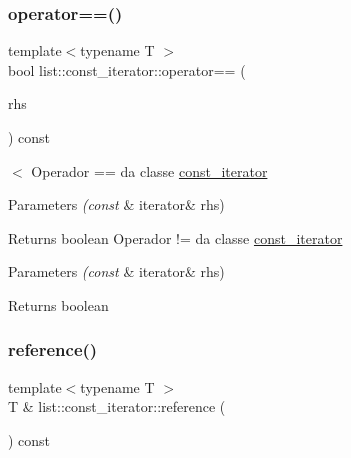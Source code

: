 \subsubsection{\texorpdfstring{operator==()}{operator==()}}
{\footnotesize\ttfamily template$<$typename T $>$ \\
bool list\+::const\+\_\+iterator\+::operator== (\begin{DoxyParamCaption}\item[{const \mbox{\hyperlink{classsc_1_1list_1_1const__iterator}{const\+\_\+iterator}} \&}]{rhs }\end{DoxyParamCaption}) const}

$<$ Operador == da classe \mbox{\hyperlink{classsc_1_1list_1_1const__iterator}{const\+\_\+iterator}} 
\begin{DoxyParams}{Parameters}
{\em (const} & iterator\& rhs) \\
\hline
\end{DoxyParams}
\begin{DoxyReturn}{Returns}
boolean  Operador != da classe \mbox{\hyperlink{classsc_1_1list_1_1const__iterator}{const\+\_\+iterator}} 
\end{DoxyReturn}

\begin{DoxyParams}{Parameters}
{\em (const} & iterator\& rhs) \\
\hline
\end{DoxyParams}
\begin{DoxyReturn}{Returns}
boolean 
\end{DoxyReturn}
\mbox{\label{classsc_1_1list_1_1const__iterator_acc55cfde0e7405a0b4cf430ccac01a26}} 
\subsubsection{\texorpdfstring{reference()}{reference()}}
{\footnotesize\ttfamily template$<$typename T $>$ \\
T \& list\+::const\+\_\+iterator\+::reference (\begin{DoxyParamCaption}{ }\end{DoxyParamCaption}) const\hspace{0.3cm}{\ttfamily [protected]}}



